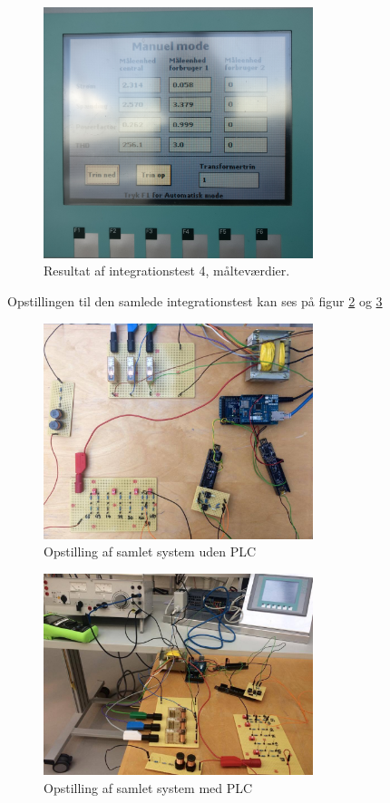 \begin{figure}[H] 
	\centering
	\includegraphics[width=0.7\textwidth]{Figure/INT4}
	\caption{Resultat af integrationstest 4, målteværdier.}
	\label{fig:INT4Mal}
\end{figure}



Opstillingen til den samlede integrationstest kan ses på figur \ref{fig:Opstilling1} og \ref{fig:Opstilling2}

\begin{figure}[H] 
	\centering
	\includegraphics[width=0.7\textwidth]{Figure/Opstillingudenplc}
	\caption{Opstilling af samlet system uden PLC}
	\label{fig:Opstilling1}
\end{figure}

\begin{figure}[H] 
	\centering
	\includegraphics[width=0.7\textwidth]{Figure/Opstillingmedplc}
	\caption{Opstilling af samlet system med PLC}
	\label{fig:Opstilling2}
\end{figure}